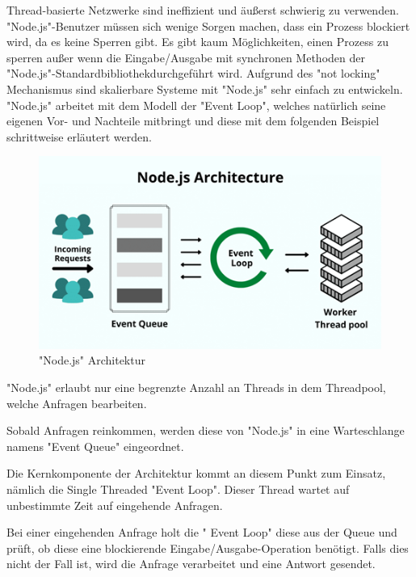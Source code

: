 Thread-basierte Netzwerke sind ineffizient und äußerst schwierig zu verwenden. "Node.js"-Benutzer müssen sich wenige Sorgen machen, dass ein Prozess blockiert wird, da es keine Sperren gibt. Es gibt kaum Möglichkeiten, einen Prozess zu sperren außer wenn die Eingabe/Ausgabe mit synchronen Methoden der "Node.js"-Standardbibliothek\linebreak durch\-geführt wird. Aufgrund des "not locking" Mechanismus sind skalierbare Systeme mit "Node.js" sehr einfach zu entwickeln. 
"Node.js" arbeitet mit dem Modell der "Event Loop", welches natürlich seine eigenen Vor- und Nachteile mitbringt und diese mit dem folgenden Beispiel schrittweise erläutert werden.


\begin{figure}[H]
    \centering
    \includegraphics{media/NodeJs/NodeJsArchitektur.png}
    \caption{"Node.js" Architektur \cite{ArchitekturFoto}}
\end{figure}


"Node.js" erlaubt nur eine begrenzte Anzahl an Threads in dem Threadpool, welche Anfragen bearbeiten. \cite{NodeJsArch} \cite{NodeJsArch2}

Sobald Anfragen reinkommen, werden diese von "Node.js" in eine Warteschlange namens "Event Queue" eingeordnet. \cite{NodeJsArch} \cite{NodeJsArch2}

Die Kernkomponente der Architektur kommt an diesem Punkt zum Einsatz, nämlich die Single Threaded "Event Loop". Dieser Thread wartet auf unbestimmte Zeit auf eingehende Anfragen. \cite{NodeJsArch} \cite{NodeJsArch2}

Bei einer eingehenden Anfrage holt die " Event Loop" diese aus der Queue und prüft, ob diese eine blockierende Eingabe/Ausgabe-Operation benötigt. Falls dies nicht der Fall ist, wird die Anfrage verarbeitet und eine Antwort gesendet. \cite{NodeJsArch} \cite{NodeJsArch2}

